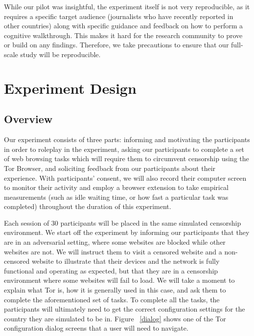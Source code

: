 \documentclass[letterpaper,twocolumn,11pt]{article}
\begin{document}
While our pilot was insightful, the experiment itself is not very reproducible, as it requires
a specific target audience (journalists who have recently reported in other countries) along 
with specific guidance and feedback on how to perform a cognitive walkthrough. This makes it hard
for the research community to prove or build on any findings. Therefore, we take precautions
to ensure that our full-scale study will be reproducible. 

\section{Experiment Design}

\subsection{Overview} 
Our experiment consists of three parts: informing and motivating the participants in order 
to roleplay in the experiment, asking our participants to complete a set of web browsing tasks which will 
require them to circumvent censorship using the Tor Browser, and soliciting feedback from our participants
about their experience. With participants' consent, we will also record their computer screen to monitor 
their activity and employ a browser extension to take empirical measurements (such as idle waiting time, 
or how fast a particular task was completed) throughout the duration of this experiment. 

Each session of 30 participants will be placed in the same simulated censorship environment. 
We start off the experiment by informing our participants that they are in an adversarial setting, 
where some websites are blocked while other websites are not. We will instruct them to visit a censored
website and a non-censored website to illustrate that their devices and the network is fully functional and
operating as expected, but that they are in a censorship environment where some websites will fail to load. 
We will take a moment to explain what Tor is, how it is generally used in this case, and ask them to complete 
the aforementioned set of tasks. To complete all the tasks, the participants will ultimately need to get the correct
configuration settings for the country they are simulated to be in.  Figure ~\ref{dialog} shows one of the 
Tor configuration dialog screens that a user will need to navigate. 
\end{document}
